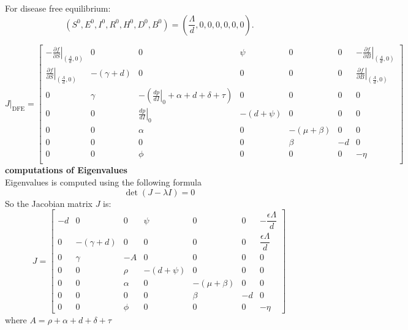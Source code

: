 \documentclass[a4paper,12pt]{report}
\begin{document}
\begin{itemize}
For disease free equilibrium: \[
(S^0, E^0, I^0, R^0, H^0, D^0, B^0) = \left( \frac{\Lambda}{d}, 0, 0, 0, 0, 0, 0 \right).
\]

\[
J\Big|_{\text{DFE}} =
\begin{bmatrix}
- \left. \frac{\partial f}{\partial S} \right|_{\left(\frac{\Lambda}{d}, 0\right)} & 0 & 0 & \psi & 0 & 0 & - \left. \frac{\partial f}{\partial B} \right|_{\left(\frac{\Lambda}{d}, 0\right)} \\
\left. \frac{\partial f}{\partial S} \right|_{\left(\frac{\Lambda}{d}, 0\right)} & -(\gamma + d) & 0 & 0 & 0 & 0 & \left. \frac{\partial f}{\partial B} \right|_{\left(\frac{\Lambda}{d}, 0\right)} \\
0 & \gamma & -\left( \left. \frac{dp}{dI} \right|_{0} + \alpha + d + \delta + \tau \right) & 0 & 0 & 0 & 0 \\
0 & 0 & \left. \frac{dp}{dI} \right|_{0} & -(d + \psi) & 0 & 0 & 0 \\
0 & 0 & \alpha & 0 & -(\mu + \beta) & 0 & 0 \\
0 & 0 & 0 & 0 & \beta & -d & 0 \\
0 & 0 & \phi & 0 & 0 & 0 & -\eta \\
\end{bmatrix}
\]
\textbf{computations of Eigenvalues}\\
Eigenvalues is computed using the following formula\\

\[
\det(J - \lambda I) = 0
\]
So the Jacobian matrix \( J \) is:
\[
J =
\begin{bmatrix}
-d & 0 & 0 & \psi & 0 & 0 & -\dfrac{\epsilon \Lambda}{d} \\
0 & -(\gamma + d) & 0 & 0 & 0 & 0 & \dfrac{\epsilon \Lambda}{d} \\
0 & \gamma & -A & 0 & 0 & 0 & 0 \\
0 & 0 & \rho & -(d + \psi) & 0 & 0 & 0 \\
0 & 0 & \alpha & 0 & -(\mu + \beta) & 0 & 0 \\
0 & 0 & 0 & 0 & \beta & -d & 0 \\
0 & 0 & \phi & 0 & 0 & 0 & -\eta
\end{bmatrix}
\]
where \( A = \rho + \alpha + d + \delta + \tau \)


\end{itemize}
\end{document}
